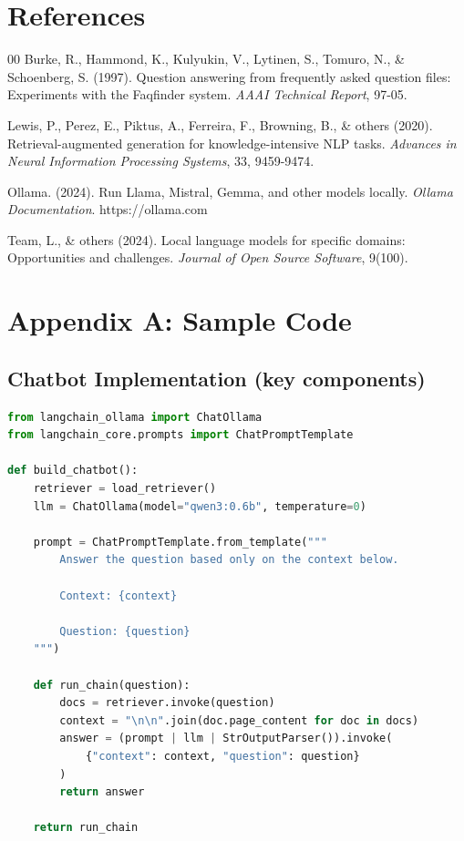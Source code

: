 \documentclass[conference]{IEEEtran}
\begin{document}
\section*{References}

\begin{thebibliography}{00}
     Burke, R., Hammond, K., Kulyukin, V., Lytinen, S., Tomuro, N., \& Schoenberg, S. (1997). Question answering from frequently asked question files: Experiments with the Faqfinder system. \textit{AAAI Technical Report}, 97-05.
    
     Lewis, P., Perez, E., Piktus, A., Ferreira, F., Browning, B., \& others (2020). Retrieval-augmented generation for knowledge-intensive NLP tasks. \textit{Advances in Neural Information Processing Systems}, 33, 9459-9474.
    
     Ollama. (2024). Run Llama, Mistral, Gemma, and other models locally. \textit{Ollama Documentation}. https://ollama.com
    
     Team, L., \& others (2024). Local language models for specific domains: Opportunities and challenges. \textit{Journal of Open Source Software}, 9(100).
\end{thebibliography}

\section*{Appendix A: Sample Code}

\subsection*{Chatbot Implementation (key components)}

\begin{lstlisting}[language=Python]
from langchain_ollama import ChatOllama
from langchain_core.prompts import ChatPromptTemplate

def build_chatbot():
    retriever = load_retriever()
    llm = ChatOllama(model="qwen3:0.6b", temperature=0)
    
    prompt = ChatPromptTemplate.from_template("""
        Answer the question based only on the context below.
        
        Context: {context}
        
        Question: {question}
    """)
    
    def run_chain(question):
        docs = retriever.invoke(question)
        context = "\n\n".join(doc.page_content for doc in docs)
        answer = (prompt | llm | StrOutputParser()).invoke(
            {"context": context, "question": question}
        )
        return answer
    
    return run_chain
\end{lstlisting}
\end{document}
